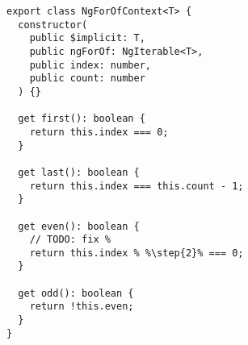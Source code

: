 \begin{verbatim}
export class NgForOfContext<T> {
  constructor(
    public $implicit: T,
    public ngForOf: NgIterable<T>,
    public index: number,
    public count: number
  ) {}

  get first(): boolean {
    return this.index === 0;
  }

  get last(): boolean {
    return this.index === this.count - 1;
  }

  get even(): boolean {
    // TODO: fix %
    return this.index % %\step{2}% === 0;
  }

  get odd(): boolean {
    return !this.even;
  }
}
\end{verbatim}
